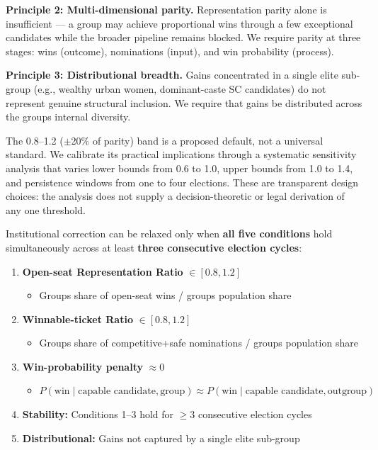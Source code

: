 \documentclass[
]{article}
\providecommand{\tightlist}{%
  \setlength{\itemsep}{0pt}\setlength{\parskip}{0pt}}
\begin{document}
\textbf{Principle 2: Multi-dimensional parity.} Representation parity alone is insufficient --- a group may achieve proportional wins through a few exceptional candidates while the broader pipeline remains blocked. We require parity at three stages: wins (outcome), nominations (input), and win probability (process).

\textbf{Principle 3: Distributional breadth.} Gains concentrated in a single elite sub-group (e.g., wealthy urban women, dominant-caste SC candidates) do not represent genuine structural inclusion. We require that gains be distributed across the group\textquotesingle s internal diversity.

The 0.8--1.2 ($\pm$20\% of parity) band is a proposed default, not a universal standard. We calibrate its practical implications through a systematic sensitivity analysis that varies lower bounds from 0.6 to 1.0, upper bounds from 1.0 to 1.4, and persistence windows from one to four elections. These are transparent design choices: the analysis does not supply a decision-theoretic or legal derivation of any one threshold.

Institutional correction can be relaxed only when \textbf{all five conditions} hold simultaneously across at least \textbf{three consecutive election cycles}:

\begin{enumerate}
\def\labelenumi{\arabic{enumi}.}
\item
  \textbf{Open-seat Representation Ratio} \(\in [0.8, 1.2]\)

  \begin{itemize}
  \tightlist
  \item
    Group\textquotesingle s share of open-seat wins / group\textquotesingle s population share
  \end{itemize}
\item
  \textbf{Winnable-ticket Ratio} \(\in [0.8, 1.2]\)

  \begin{itemize}
  \tightlist
  \item
    Group\textquotesingle s share of competitive+safe nominations / group\textquotesingle s population share
  \end{itemize}
\item
  \textbf{Win-probability penalty} \(\approx 0\)

  \begin{itemize}
  \tightlist
  \item
    \(P(\text{win} \mid \text{capable candidate}, \text{group}) \approx P(\text{win} \mid \text{capable candidate}, \text{outgroup})\)
  \end{itemize}
\item
  \textbf{Stability:} Conditions 1--3 hold for \(\geq 3\) consecutive election cycles
\item
  \textbf{Distributional:} Gains not captured by a single elite sub-group
\end{enumerate}
\end{document}
